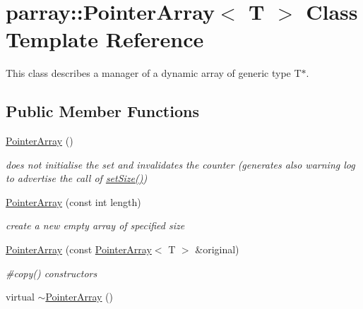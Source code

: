 \hypertarget{classparray_1_1PointerArray}{\section{parray\-:\-:Pointer\-Array$<$ T $>$ Class Template Reference}
\label{classparray_1_1PointerArray}
}


This class describes a manager of a dynamic array of generic type T$\ast$.  


\subsection*{Public Member Functions}
\begin{DoxyCompactItemize}
\item 
\hypertarget{classparray_1_1PointerArray_ab506b284822d1e013813579e06893797}{\hyperlink{classparray_1_1PointerArray_ab506b284822d1e013813579e06893797}{Pointer\-Array} ()}\label{classparray_1_1PointerArray_ab506b284822d1e013813579e06893797}

\begin{DoxyCompactList}\small\item\em does not initialise the set and invalidates the counter (generates also warning log to advertise the call of \hyperlink{classparray_1_1PointerArray_ae3fb455ddc80180a3a7b130cb2c4d903}{set\-Size()}) \end{DoxyCompactList}\item 
\hypertarget{classparray_1_1PointerArray_a4e39d7adf15e94c02dfe2662c181f0c6}{\hyperlink{classparray_1_1PointerArray_a4e39d7adf15e94c02dfe2662c181f0c6}{Pointer\-Array} (const int length)}\label{classparray_1_1PointerArray_a4e39d7adf15e94c02dfe2662c181f0c6}

\begin{DoxyCompactList}\small\item\em create a new empty array of specified size \end{DoxyCompactList}\item 
\hypertarget{classparray_1_1PointerArray_ab763be75c142552337e545ca0a27d93e}{\hyperlink{classparray_1_1PointerArray_ab763be75c142552337e545ca0a27d93e}{Pointer\-Array} (const \hyperlink{classparray_1_1PointerArray}{Pointer\-Array}$<$ T $>$ \&original)}\label{classparray_1_1PointerArray_ab763be75c142552337e545ca0a27d93e}

\begin{DoxyCompactList}\small\item\em \#copy() constructors \end{DoxyCompactList}\item 
\hypertarget{classparray_1_1PointerArray_a3b59a3fe4f7e83d83231d9daf8210333}{virtual \hyperlink{classparray_1_1PointerArray_a3b59a3fe4f7e83d83231d9daf8210333}{$\sim$\-Pointer\-Array} ()}\label{classparray_1_1PointerArray_a3b59a3fe4f7e83d83231d9daf8210333}


\end{DoxyCompactItemize}
